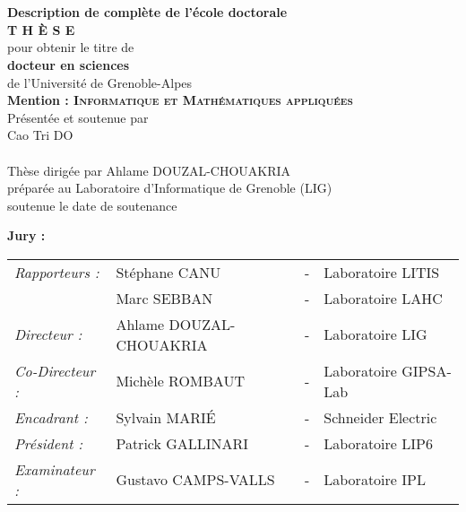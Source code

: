\cleardoublepage
\begin{titlepage}
\begin{center}
 \\
\vspace*{0.3cm}
 \\
\noindent \textbf{Description de complète de l'école doctorale} \\
\vspace*{0.5cm}
\noindent \Huge \textbf{T H È S E} \\
\vspace*{0.3cm}
\noindent \large {pour obtenir le titre de} \\
\vspace*{0.3cm}
\noindent \LARGE \textbf{docteur en sciences} \\
\vspace*{0.3cm}
\noindent \Large de l'Université de Grenoble-Alpes\\
\noindent \Large \textbf{Mention : \textsc{Informatique et Mathématiques appliquées}}\\
\vspace*{0.4cm}
\noindent \large {Présentée et soutenue par\\}
\noindent \LARGE Cao Tri DO \\
\vspace*{0.8cm}
 \\
\vspace*{0.8cm}
\noindent \Large Thèse dirigée par Ahlame DOUZAL-CHOUAKRIA\\
\vspace*{0.2cm}
\noindent \Large préparée au Laboratoire d'Informatique de Grenoble (LIG) \\
\vspace*{0.2cm}
\noindent \large soutenue le date de soutenance \\
\vspace*{0.5cm}
\end{center}
\noindent \large \textbf{Jury :} \\
\begin{center}
\noindent \large 
\begin{tabular}{llcl}
      \textit{Rapporteurs :}	& Stéphane CANU		& - & Laboratoire LITIS\\
                				& Marc SEBBAN		& - & Laboratoire LAHC\\
      \textit{Directeur :}	    & Ahlame DOUZAL-CHOUAKRIA & - & Laboratoire LIG\\
      \textit{Co-Directeur :}	& Michèle ROMBAUT	& - & Laboratoire GIPSA-Lab\\
      \textit{Encadrant :}	    & Sylvain MARI\'{E}	& - & Schneider Electric\\
      \textit{Président :}	    & Patrick GALLINARI	& - & Laboratoire LIP6\\
      \textit{Examinateur :}    & Gustavo CAMPS-VALLS & - & Laboratoire IPL\\
\end{tabular}
\end{center}
\end{titlepage}
\sloppy

\titlepage

